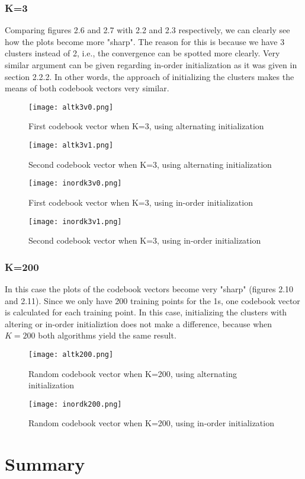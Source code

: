 \documentclass[a4paper, 11pt]{report}
\begin{document}
\subsection{K=3}
Comparing figures 2.6 and 2.7 with 2.2 and 2.3 respectively, we can clearly see how the plots become more "sharp". The reason for this is because we have 3 clusters instead of 2, i.e., the convergence can be spotted more clearly. Very similar argument can be given regarding in-order initialization as it was given in section 2.2.2. In other words, the approach of initializing the clusters makes the means of both codebook vectors very similar.
\begin{figure}[!ht]
    \texttt{[image: altk3v0.png]}
    \caption{First codebook vector when K=3, using alternating initialization}
    \texttt{[image: altk3v1.png]}
    \caption{Second codebook vector when K=3, using alternating initialization}
\end{figure}
\begin{figure}[!ht]
    \texttt{[image: inordk3v0.png]}
    \caption{First codebook vector when K=3, using in-order initialization}
    \texttt{[image: inordk3v1.png]}
    \caption{Second codebook vector when K=3, using in-order initialization}
\end{figure}

\subsection{K=200}
In this case the plots of the codebook vectors become very "sharp" (figures 2.10 and 2.11). Since we only have 200 training points for the 1s, one codebook vector is calculated for each training point. In this case, initializing the clusters with altering or in-order initializtion does not make a difference, because when $K=200$ both algorithms yield the same result. 
\begin{figure}[!ht]
    \texttt{[image: altk200.png]}
    \caption{Random codebook vector when K=200, using alternating initialization}
    \texttt{[image: inordk200.png]}
    \caption{Random codebook vector when K=200, using in-order initialization}
\end{figure}

\chapter{Summary}
\end{document}
